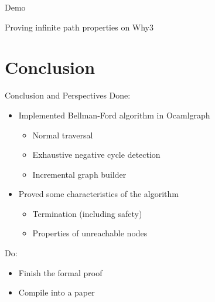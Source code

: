 \documentclass{beamer}
\begin{document}
\begin{frame}

\Huge \alert{Demo}\vspace{8pt}

\large Proving infinite path properties on Why3

\end{frame}

\section{Conclusion}

\frame{\sectionpage}
\begin{frame}{Conclusion and Perspectives}
Done:

\begin{itemize}
\item Implemented Bellman-Ford algorithm in Ocamlgraph
\begin{itemize}
\item Normal traversal
\item Exhaustive negative cycle detection
\item Incremental graph builder
\end{itemize}

\item Proved some characteristics of the algorithm
\begin{itemize}
\item Termination (including safety)
\item Properties of unreachable nodes
\end{itemize}
\end{itemize}

Do:
\begin{itemize}
\item Finish the formal proof
\item Compile into a paper
\end{itemize}
\end{frame}
\end{document}
